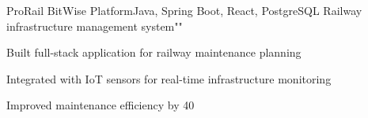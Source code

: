\resumeSubheading
  {ProRail BitWise Platform}{Java, Spring Boot, React, PostgreSQL}
  {Railway infrastructure management system}{""}
  \vspace{\experienceItemSpacing}
  \resumeItemListStart
\item Built full-stack application for railway maintenance planning
\item Integrated with IoT sensors for real-time infrastructure monitoring
\item Improved maintenance efficiency by 40%
  \resumeItemListEnd